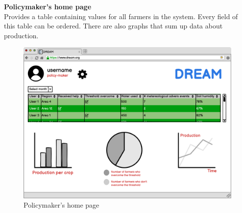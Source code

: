 \textbf{Policymaker's home page} \\
Provides a table containing values for all farmers in the system. Every field of this table can be ordered.
\newline There are also graphs that sum up data about production.
\begin{figure}[H]
    \centering
    \includegraphics[scale=0.40]{Images/policymakerHomePage.png}
    \caption{Policymaker's home page}
\end{figure}

